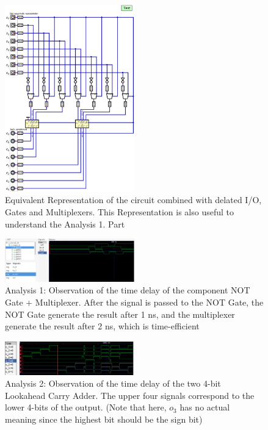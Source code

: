 \documentclass[conference]{IEEEtran}
\begin{document}
\begin{figure}[h!]
    \centering
    \includegraphics[width=0.5\textwidth]{assets/twos_complement_dq_copy_delay.png}
    \caption{Equivalent Representation of the circuit combined with delated I/O, Gates and Multiplexers. This Representation is also useful to understand the Analysis 1. Part}
    \label{fig:delay}
\end{figure}


\begin{figure}[h!]
    \centering
    \includegraphics[width=0.5\textwidth]{assets/gtkwave-1.png}
    \caption{Analysis 1: Observation of the time delay of the component {NOT Gate + Multiplexer}. After the signal is passed to the NOT Gate, the NOT Gate generate the result after 1 ns, and the multiplexer generate the result after 2 ns, which is time-efficient}
    \label{fig:analysis1}
\end{figure}

\begin{figure}[h!]
    \centering
    \includegraphics[width=0.5\textwidth]{assets/gtkwave-2.png}
    \caption{Analysis 2: Observation of the time delay of the two 4-bit Lookahead Carry Adder. The upper four signals correspond to the lower 4-bits of the output. (Note that here, $o_3$ has no actual meaning since the highest bit should be the sign bit)}
    \label{fig:analysis2}
\end{figure}
\end{document}
